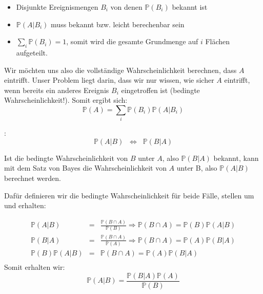 {\begin{satz}
    \begin{itemize}
        \item Disjunkte Ereignismengen $B_{i}$ von denen $\mathbb P\left(B_{i}\right)$ bekannt ist
        \item $\mathbb P\left(A|B_{i}\right)$ muss bekannt bzw. leicht berechenbar sein
        \item $\sum_{i}{\mathbb P\left(B_{i}\right)}=1$, somit wird die gesamte Grundmenge auf $i$ Flächen aufgeteilt.
    \end{itemize}

    Wir möchten uns also die vollständige Wahrscheinlichkeit berechnen, dass
    $A$ eintrifft. Unser Problem liegt darin, dass wir nur wissen, wie sicher
    $A$ eintrifft, wenn bereits ein anderes Ereignis
    $B_{i}$ eingetroffen ist (bedingte Wahrscheinlichkeit!). Somit ergibt sich:
    \[
        \mathbb P\left(A\right)=\sum _{i}{\mathbb P(B_{i})\mathbb P\left(A|B_{i}\right)}
    \]
    \end{satz}

    \begin{satz}:\\
        \label{satz:bayes}
        \[\mathbb{P}(A|B)\;\;\Longleftrightarrow\;\;\mathbb{P}(B|A)\]

        Ist die bedingte Wahrscheinlichkeit von $B$ unter $A$, also 
        $\mathbb P\left(B|A\right)$ bekannt, kann mit dem Satz von Bayes
        die Wahrscheinlichkeit von $A$ unter B, also $\mathbb P(A|B)$
        berechnet werden. 
        
        Dafür definieren wir die bedingte Wahrscheinlichkeit
        für beide Fälle, stellen um und erhalten:

        \begin{eqnarray*}
            \mathbb P\left(A|B\right)&=&\frac{\mathbb P\left(B\cap
                A\right)}{\mathbb P\left(B\right)}\Rightarrow \mathbb P\left(B\cap
                A\right)=\mathbb P\left(B\right)\mathbb P(A|B)\\
            \mathbb P\left(B|A\right)&=&\frac{\mathbb P\left(B\cap
                A\right)}{\mathbb P(A)}\Rightarrow \mathbb P\left(B\cap
                A\right)=\mathbb P\left(A\right)\mathbb P(B|A)\\
            \mathbb P\left(B\right)\mathbb P\left(A|B\right)&=&\mathbb P\left(B\cap A\right)=
                \mathbb P\left(A\right)\mathbb P\left(B|A\right)\\
        \end{eqnarray*}
        Somit erhalten wir:
        \[\mathbb P\left(A|B\right)=\frac{\mathbb P\left(B|A\right)\mathbb P\left(A\right)}{\mathbb P(B)}\]
    \end{satz}

}
